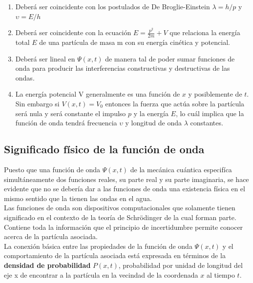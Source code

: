 \documentclass[oneside]{book}
\numberwithin{equation}{section}
\numberwithin{figure}{section}
\numberwithin{table}{section}
\begin{document}
			\begin{enumerate}
				\item Deberá ser coincidente con los postulados de De Broglie-Einstein $\lambda=h/p$ y $\upsilon=E/h$
				\item Deberá ser coincidente con la ecuación $E=\frac{p^2}{2m}+V$ que relaciona la energía total $E$ de una partícula de masa m con su energía cinética y potencial.
				\item Deberá ser lineal en $\Psi(x,t)$ de manera tal de poder sumar funciones de onda para producir las interferencias constructivas y destructivas de las ondas.
				\item La energía potencial V generalmente es una función de $x$ y posiblemente de $t$. Sin embargo si $V(x,t)=V_0$ entonces la fuerza que actúa sobre la partícula será nula y será constante el impulso $p$ y la energía $E$, lo cuál implica que la función de onda tendrá frecuencia $\upsilon$ y longitud de onda $\lambda$ constantes.
			\end{enumerate}
			
			\subsection{Significado físico de la función de onda}
			
				Puesto que una función de onda  $\displaystyle \Psi(x,t)$ de la mecánica cuántica especifíca simultáneamente dos funciones reales, su parte real y su parte imaginaria, se hace evidente que no se debería dar a las funciones de onda una existencia física en el mismo sentido que la tienen las ondas en el agua.\\
				
				Las funciones de onda son dispositivos computacionales que solamente tienen significado en el contexto de la teoría de Schrödinger de la cual forman parte. Contiene toda la información que el principio de incertidumbre permite conocer acerca de la partícula asociada.\\		
			
				La conexión básica entre las propiedades de la función de onda $\displaystyle \Psi(x,t)$ y el comportamiento de la partícula asociada  está expresada en términos de la \textbf{densidad de probabilidad} $P(x,t)$, probabilidad por unidad de longitud del eje x de encontrar a la partícula en la vecindad de la coordenada $x$ al tiempo $t$.
				
				\begin{center}
				\end{center}
							
\end{document}
